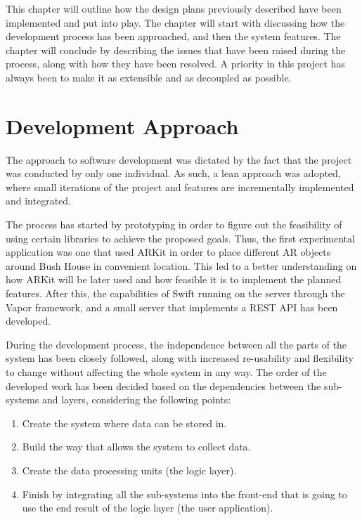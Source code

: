 This chapter will outline how the design plans previously described have been implemented and put into play. The chapter will start with discussing how the development process has been approached, and then the system features. The chapter will conclude by describing the issues that have been raised during the process, along with how they have been resolved. A priority in this project has always been to make it as extensible and as decoupled as possible.

\section{Development Approach}
The approach to software development was dictated by the fact that the project was conducted by only one individual. As such, a lean approach was adopted, where small iterations of the project and features are incrementally implemented and integrated. 

The process has started by prototyping in order to figure out the feasibility of using certain libraries to achieve the proposed goals. Thus, the first experimental application was one that used ARKit in order to place different AR objects around Bush House in convenient location. This led to a better understanding on how ARKit will be later used and how feasible it is to implement the planned features. After this, the capabilities of Swift running on the server through the Vapor framework, and a small server that implements a REST API has been developed.

During the development process, the independence between all the parts of the system has been closely followed, along with increased re-usability and flexibility to change without affecting the whole system in any way. The order of the developed work has been decided based on the dependencies between the sub-systems and layers, considering the following points:
\begin{enumerate}
    \item Create the system where data can be stored in.
    \item Build the way that allows the system to collect data.
    \item Create the data processing units (the logic layer).
    \item Finish by integrating all the sub-systems into the front-end that is going to use the end result of the logic layer (the user application).
\end{enumerate}

